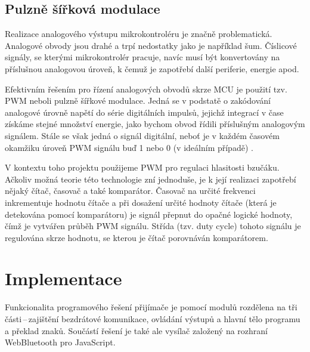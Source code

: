 \documentclass[10pt]{article}
\begin{document}
\subsection{Pulzně šířková modulace}
\par Realizace analogového výstupu mikrokontroléru je značně problematická. Analogové obvody jsou drahé a trpí nedostatky jako je například šum. Číslicové signály, se kterými mikrokontrolér pracuje, navíc musí být konvertovány na příslušnou analogovou úroveň, k čemuž je zapotřebí další periferie, energie apod.
\par Efektivním řešením pro řízení analogových obvodů skrze MCU je použití tzv. PWM neboli pulzně šířkové modulace. Jedná se v podstatě o zakódování analogové úrovně napětí do série digitálních impulsů, jejichž integrací v čase získáme stejné množství energie, jako bychom obvod řídili příslušným analogovým signálem. Stále se však jedná o signál digitální, neboť je v každém časovém okamžiku úroveň PWM signálu buď 1 nebo 0 (v ideálním případě) \cite{barr}.
\par V kontextu toho projektu použijeme PWM pro regulaci hlasitosti bzučáku. Ačkoliv možná teorie této technologie zní jednoduše, je k její realizaci zapotřebí nějaký čítač, časovač a také komparátor. Časovač na určité frekvenci inkrementuje hodnotu čítače a při dosažení určité hodnoty čítače (která je detekována pomocí komparátoru) je signál přepnut do opačné logické hodnoty, čímž je vytvářen průběh PWM signálu. Střída (tzv. duty cycle) tohoto signálu je regulována skrze hodnotu, se kterou je čítač porovnáván komparátorem.

\section{Implementace}
\par Funkcionalita programového řešení přijímače je pomocí modulů rozdělena na tři části\,--\,zajištění bezdrátové komunikace, ovládání výstupů a hlavní tělo programu a překlad znaků. Součástí řešení je také ale vysílač založený na rozhraní WebBluetooth pro JavaScript.
\end{document}
